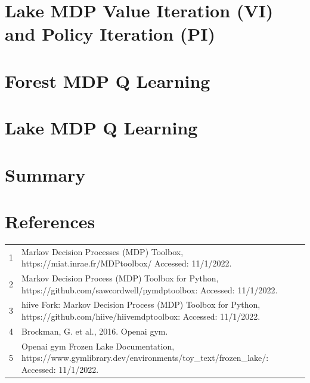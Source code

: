 \documentclass[letterpaper]{article} %
\begin{document}
\section{Lake MDP Value Iteration (VI) and Policy Iteration (PI)}

\section{Forest MDP Q Learning}

\section{Lake MDP Q Learning}

\section{Summary}

\section{References}
\begin{tabular}{l p{2.75in}}
\\
1 & Markov Decision Processes (MDP) Toolbox, https://miat.inrae.fr/MDPtoolbox/ Accessed: 11/1/2022.
\\
2 & Markov Decision Process (MDP) Toolbox for Python, https://github.com/sawcordwell/pymdptoolbox: Accessed: 11/1/2022.
\\
3 & hiive Fork: Markov Decision Process (MDP) Toolbox for Python, https://github.com/hiive/hiivemdptoolbox: Accessed: 11/1/2022.
\\
4 & Brockman, G. et al., 2016. Openai gym.
\\
5 & Openai gym Frozen Lake Documentation,  https://www.gymlibrary.dev/environments/toy\_text/frozen\_lake/: Accessed: 11/1/2022.

\end{tabular}
\end{document}
